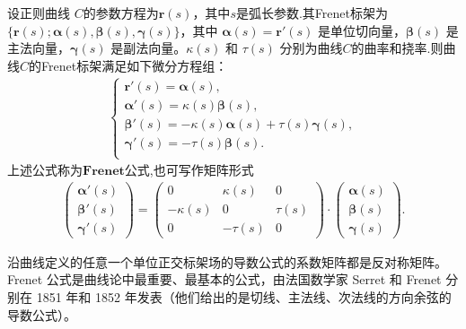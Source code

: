\documentclass[../../main.tex]{subfiles}%
\begin{document}
\begin{theorem}[Frenet 公式]\label{theorem:微分几何-Frenet公式}
设正则曲线 $C$的参数方程为$\bm{r}(s)$，其中$s$是弧长参数.其Frenet标架为 $\{\bm{r}(s); \bm{\alpha}(s), \bm{\beta}(s), \bm{\gamma}(s)\}$，其中 $\bm{\alpha}(s)=\bm{r}'(s)$ 是单位切向量，$\bm{\beta}(s)$ 是主法向量，$\bm{\gamma}(s)$ 是副法向量。$\kappa(s)$ 和 $\tau(s)$ 分别为曲线$C$的曲率和挠率.则曲线$C$的Frenet标架满足如下微分方程组：
\begin{align}\label{eq::Frenet公式}
\begin{cases}
\boldsymbol{r}' (s)=\boldsymbol{\alpha }(s),\\
\boldsymbol{\alpha }' (s)=\kappa (s)\boldsymbol{\beta }(s),\\
\boldsymbol{\beta }' (s)=-\kappa (s)\boldsymbol{\alpha }(s)+\tau (s)\boldsymbol{\gamma }(s),\\
\boldsymbol{\gamma }' (s)=-\tau (s)\boldsymbol{\beta }(s).\\
\end{cases}
\end{align}
上述公式称为$\mathbf{Frenet公式}$,也可写作矩阵形式
\begin{align*}
\begin{pmatrix}
\bm{\alpha}'(s) \\
\bm{\beta}'(s) \\
\bm{\gamma}'(s)
\end{pmatrix}
=
\begin{pmatrix}
0 & \kappa(s) & 0 \\
-\kappa(s) & 0 & \tau(s) \\
0 & -\tau(s) & 0
\end{pmatrix}
\cdot
\begin{pmatrix}
\bm{\alpha}(s) \\
\bm{\beta}(s) \\
\bm{\gamma}(s)
\end{pmatrix}. 
\end{align*}
\end{theorem}
\begin{remark}
沿曲线定义的任意一个单位正交标架场的导数公式的系数矩阵都是反对称矩阵。Frenet 公式是曲线论中最重要、最基本的公式，由法国数学家 Serret 和 Frenet 分别在 1851 年和 1852 年发表（他们给出的是切线、主法线、次法线的方向余弦的导数公式）。
\end{remark}
\end{document}
